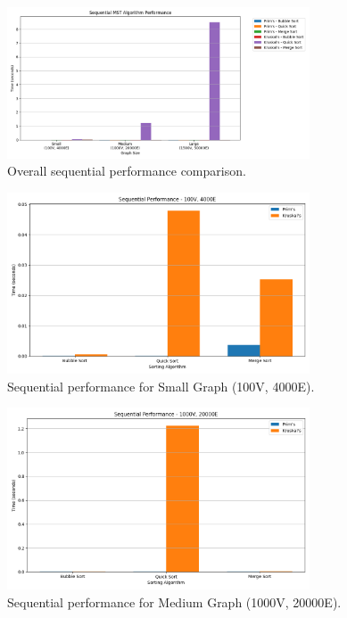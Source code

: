 \documentclass[11pt]{article}
\begin{document}
\begin{figure}[H]
    \centering
    \includegraphics[width=0.8\textwidth]{sequential_comparison.png}
    \caption{Overall sequential performance comparison.}
    \label{fig:sequential_comparison}
\end{figure}

\begin{figure}[H]
    \centering
    \includegraphics[width=0.8\textwidth]{sequential_small.png}
    \caption{Sequential performance for Small Graph (100V, 4000E).}
    \label{fig:sequential_small}
\end{figure}

\begin{figure}[H]
    \centering
    \includegraphics[width=0.8\textwidth]{sequential_medium.png}
    \caption{Sequential performance for Medium Graph (1000V, 20000E).}
    \label{fig:sequential_medium}
\end{figure}
\end{document}
